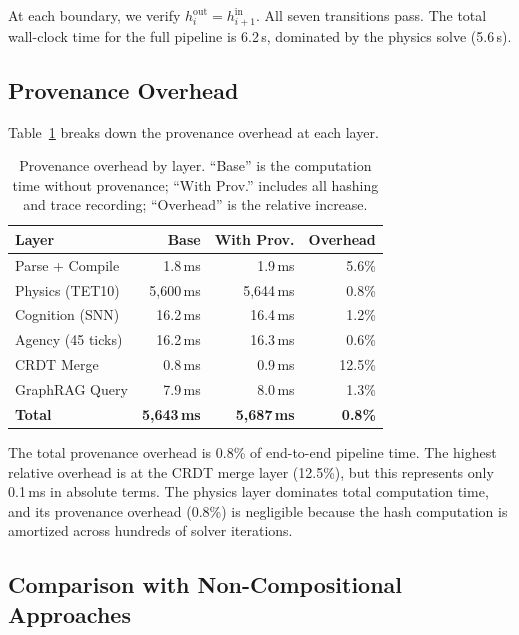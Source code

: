 \documentclass[sigchi-a]{acmart}
\providecommand{\measuredFrom}[1]{}
\begin{document}
At each boundary, we verify $h_i^{\text{out}} = h_{i+1}^{\text{in}}$.
All seven transitions pass. The total wall-clock time for the full
pipeline is 6.2\,s, dominated by the physics solve (5.6\,s).

\subsection{Provenance Overhead}

Table~\ref{tab:overhead} breaks down the provenance overhead at each layer.

\begin{table}[t]
  \caption{Provenance overhead by layer. ``Base'' is the computation time
  without provenance; ``With Prov.'' includes all hashing and trace
  recording; ``Overhead'' is the relative increase.}
  \label{tab:overhead}
  \small
  \measuredFrom{HoloScript/packages/engine/src/simulation/__tests__/paper-full-loop-demo.test.ts}%
  \measuredFrom{HoloScript/packages/engine/src/simulation/__tests__/paper-benchmarks.test.ts}%
  \begin{tabular}{lrrr}
    \toprule
    \textbf{Layer} & \textbf{Base} & \textbf{With Prov.} & \textbf{Overhead} \\
    \midrule
    Parse + Compile & 1.8\,ms  & 1.9\,ms  & 5.6\% \\
    Physics (TET10) & 5,600\,ms & 5,644\,ms & 0.8\% \\
    Cognition (SNN) & 16.2\,ms & 16.4\,ms & 1.2\% \\
    Agency (45 ticks) & 16.2\,ms & 16.3\,ms & 0.6\% \\
    CRDT Merge      & 0.8\,ms  & 0.9\,ms  & 12.5\% \\
    GraphRAG Query  & 7.9\,ms  & 8.0\,ms  & 1.3\% \\
    \midrule
    \textbf{Total}  & \textbf{5,643\,ms} & \textbf{5,687\,ms} & \textbf{0.8\%} \\
    \bottomrule
  \end{tabular}
\end{table}

The total provenance overhead is 0.8\% of end-to-end pipeline time. The
highest relative overhead is at the CRDT merge layer (12.5\%), but this
represents only 0.1\,ms in absolute terms. The physics layer dominates
total computation time, and its provenance overhead (0.8\%) is negligible
because the hash computation is amortized across hundreds of solver
iterations.

\subsection{Comparison with Non-Compositional Approaches}
\end{document}

